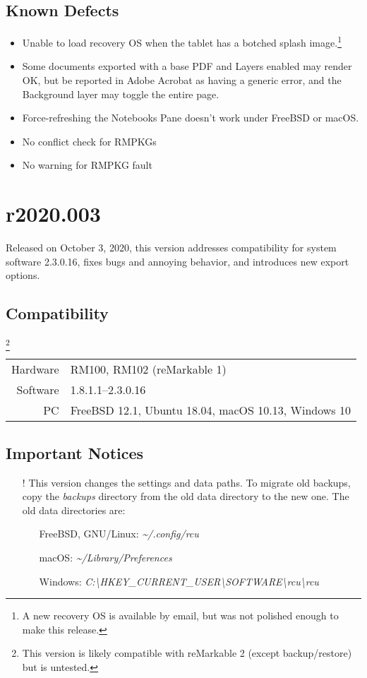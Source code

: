 \subsection{Known Defects}
\begin{itemize}
\item{Unable to load recovery OS when the tablet has a botched splash image.\footnote{A new recovery OS is available by email, but was not polished enough to make this release.}}
\item{Some documents exported with a base PDF and Layers enabled may render OK, but be reported in Adobe Acrobat as having a generic error, and the Background layer may toggle the entire page.}
\item{Force-refreshing the Notebooks Pane doesn't work under FreeBSD or macOS.}
\item{No conflict check for RMPKGs}
\item{No warning for RMPKG fault}
\end{itemize}




\newpage
\section{r2020.003}
\label{sec:r2020-003}
Released on October 3, 2020, this version addresses compatibility for system software 2.3.0.16, fixes bugs and annoying behavior, and introduces new export options.

\subsection{Compatibility}
\footnote{This version is likely compatible with reMarkable 2 (except backup/restore) but is untested.}
\begin{tabular}{ r | l }
  Hardware & RM100, RM102 (reMarkable 1) \\
  Software & 1.8.1.1--2.3.0.16 \\
  PC & FreeBSD 12.1, Ubuntu 18.04, macOS 10.13, Windows 10 \\
\end{tabular}

\subsection{Important Notices}
\begin{itemize}
\item[!]{This version changes the settings and data paths. To migrate old backups, copy the \textit{backups} directory from the old data directory to the new one. The old data directories are:}
  \begin{itemize}
  \item[]{FreeBSD, GNU/Linux: \textit{\textasciitilde/.config/rcu}}
  \item[]{macOS: \textit{\textasciitilde/Library/Preferences}}
  \item[]{Windows: \textit{C:\textbackslash HKEY\_CURRENT\_USER\textbackslash SOFTWARE\textbackslash rcu\textbackslash rcu}}
  \end{itemize}
\end{itemize}

